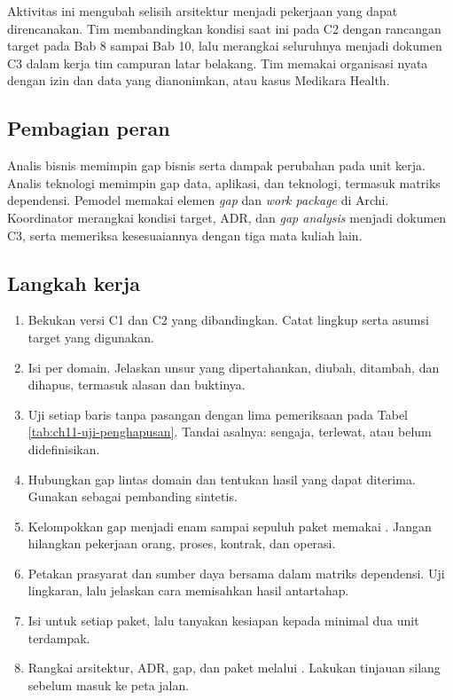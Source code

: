 Aktivitas ini mengubah selisih arsitektur menjadi pekerjaan yang dapat direncanakan. Tim membandingkan kondisi saat ini pada C2 dengan rancangan target pada Bab 8
sampai Bab 10, lalu merangkai seluruhnya menjadi dokumen C3 dalam kerja tim campuran latar belakang. Tim memakai organisasi nyata dengan izin dan data yang
dianonimkan, atau kasus Medikara Health.

\subsection*{Pembagian peran}

Analis bisnis memimpin gap bisnis serta dampak perubahan pada unit kerja. Analis teknologi memimpin gap data,
aplikasi, dan teknologi, termasuk matriks dependensi. Pemodel memakai elemen \textit{gap} dan \textit{work
package} di Archi. Koordinator merangkai kondisi target, ADR, dan \textit{gap analysis} menjadi dokumen C3, serta
memeriksa kesesuaiannya dengan tiga mata kuliah lain.

\subsection*{Langkah kerja}

\begin{enumerate}
  \item Bekukan versi C1 dan C2 yang dibandingkan. Catat lingkup serta asumsi target yang digunakan.
  \item Isi  per domain. Jelaskan unsur yang dipertahankan, diubah, ditambah, dan dihapus, termasuk alasan dan buktinya.
  \item Uji setiap baris tanpa pasangan dengan lima pemeriksaan pada Tabel \ref{tab:ch11-uji-penghapusan}. Tandai asalnya: sengaja, terlewat, atau belum didefinisikan.
  \item Hubungkan gap lintas domain dan tentukan hasil yang dapat diterima. Gunakan  sebagai pembanding sintetis.
  \item Kelompokkan gap menjadi enam sampai sepuluh paket memakai . Jangan hilangkan pekerjaan orang, proses, kontrak, dan operasi.
  \item Petakan prasyarat dan sumber daya bersama dalam matriks dependensi. Uji lingkaran, lalu jelaskan cara memisahkan hasil antartahap.
  \item Isi  untuk setiap paket, lalu tanyakan kesiapan kepada minimal dua unit terdampak.
  \item Rangkai arsitektur, ADR, gap, dan paket melalui . Lakukan tinjauan silang sebelum masuk ke peta jalan.
\end{enumerate}

